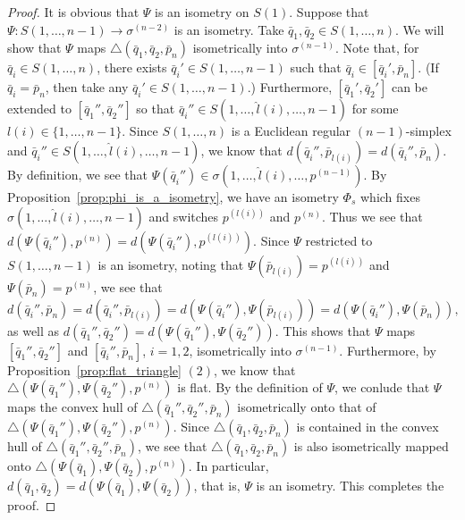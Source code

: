 \documentclass[12pt]{amsart}
\numberwithin{equation}{section}
\theoremstyle{plain}
\theoremstyle{definition}
\theoremstyle{remark}
\newcommand{\p}[1]{p^{(#1)}}
\newcommand{\tri}[3]{\triangle(#1,#2,#3)}
\begin{document}
\begin{proof}
 It is obvious that $\Psi$ is an isometry on $S(1)$. 
 Suppose that $\Psi\colon S(1,\dots,n-1) \rightarrow \sigma^{(n-2)}$ is
 an isometry. 
 Take $\bar q_1, \bar q_2 \in S(1,\dots, n)$.  
 We will show that $\Psi$ maps 
 $\tri{\bar q_1}{\bar q_2}{\bar p_n}$ isometrically
 into $\sigma^{(n-1)}$. 
 Note that, for $\bar q_i \in S(1, \dots, n)$, there exists 
 $\bar q_i' \in S(1, \dots, n-1)$ such that 
 $\bar q_i \in [\bar q_i', \bar p_n]$. (If $\bar q_i=\bar p_n$, then
 take any $\bar q_i' \in S(1,\dots, n-1)$.)
 Furthermore, $[\bar q_1', \bar q_2']$ can be extended to 
 $[\bar q_1'', \bar q_2'']$ so that 
 $\bar q_i'' \in S(1, \dots, \hat l(i), \dots, n-1)$ for some 
 $l(i) \in \{1,\dots,n-1\}$. 
 Since $S(1, \dots, n)$ is a Euclidean regular
 $(n-1)$-simplex and $\bar q_i'' \in S(1,\dots, \hat l(i),\dots, n-1)$,
 we know that $d(\bar q_i'', \bar p_{l(i)})=d(\bar q_i'', \bar p_n)$. 
 By definition, we see that 
 $\Psi(\bar q_i'')\in \sigma(1,\dots, \hat l(i), \dots, p^{(n-1)})$. 
 By Proposition~\ref{prop:phi_is_a_isometry}, we have an isometry
 $\Phi_s$ which fixes 
 $\sigma(1,\dots, \hat l(i), \dots, n-1)$ and switches 
 $p^{(l(i))}$ and $\p{n}$. 
 Thus we see that 
 $d(\Psi(\bar q_i''), \p{n})=d(\Psi(\bar q_i''),\p{l(i)})$.  
 Since $\Psi$ restricted to $S(1, \dots, n-1)$ is an
 isometry, noting that $\Psi(\bar p_{l(i)})=p^{(l(i))}$ and 
 $\Psi(\bar p_n)=p^{(n)}$,  we see that 
\begin{equation*}
  d(\bar q_i'', \bar p_n)= d(\bar q_i'',  \bar p_{l(i)})
  = d(\Psi(\bar q_i''),\Psi(\bar p_{l(i)}))=
  d(\Psi(\bar q_i''),\Psi(\bar p_n)), 
\end{equation*}  
 as well as
 $d(\bar q_1'', \bar q_2'')=d(\Psi(\bar q_1''),\Psi(\bar q_2''))$.
 This shows that $\Psi$ maps $[\bar q_1'', \bar q_2'']$ and 
 $[\bar q_i'', \bar p_n]$, $i=1,2$, isometrically into
 $\sigma^{(n-1)}$. 
 Furthermore, by Proposition~\ref{prop:flat_triangle} $(2)$, we know
 that $\tri{\Psi(\bar q_1'')}{\Psi(\bar q_2'')}{p^{(n)}}$ is flat. 
 By the definition of $\Psi$,  we conlude that $\Psi$ maps the convex
 hull of $\tri{\bar q_1''}{\bar q_2''}{\bar p_n}$ isometrically onto
 that of $\tri{\Psi(\bar q_1'')}{\Psi(\bar q_2'')}{p^{(n)}}$. 
 Since $\tri{\bar q_1}{\bar q_2}{\bar p_n}$ is
 contained in the convex hull of 
 $\tri{\bar q_1''}{\bar q_2''}{\bar p_n}$, 
 we see that
 $\tri{\bar q_1}{\bar q_2}{\bar p_n}$ is also isometrically mapped onto
 $\tri{\Psi(\bar q_1)}{\Psi(\bar q_2)}{p^{(n)}}$.
 In particular, 
 $d(\bar q_1, \bar q_2)=d(\Psi(\bar q_1), \Psi(\bar q_2))$, that is, 
 $\Psi$ is an isometry. This completes the proof. 
\end{proof}
\end{document}
